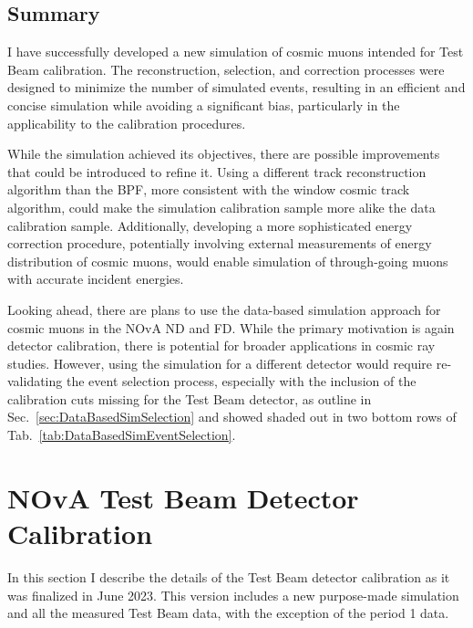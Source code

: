 \subsection{Summary}
I have successfully developed a new simulation of cosmic muons intended for Test Beam calibration. The reconstruction, selection, and correction processes were designed to minimize the number of simulated events, resulting in an efficient and concise simulation while avoiding a significant bias, particularly in the applicability to the calibration procedures.

While the simulation achieved its objectives, there are possible improvements that could be introduced to refine it. Using a different track reconstruction algorithm than the \gls{BPF}, more consistent with the window cosmic track algorithm, could make the simulation calibration sample more alike the data calibration sample. Additionally, developing a more sophisticated energy correction procedure, potentially involving external measurements of energy distribution of cosmic muons, would enable simulation of through-going muons with accurate incident energies.

Looking ahead, there are plans to use the data-based simulation approach for cosmic muons in the \gls{NOvA} \gls{ND} and \gls{FD}. While the primary motivation is again detector calibration, there is potential for broader applications in cosmic ray studies. However, using the simulation for a different detector would require re-validating the event selection process, especially with the inclusion of the calibration cuts missing for the Test Beam detector, as outline in Sec.~\ref{sec:DataBasedSimSelection} and showed shaded out in two bottom rows of Tab.~\ref{tab:DataBasedSimEventSelection}.

\section{NOvA Test Beam Detector Calibration}\label{sec:TBCalibrationSection}
In this section I describe the details of the Test Beam detector calibration as it was finalized in June 2023. This version includes a new purpose-made simulation and all the measured Test Beam data, with the exception of the period 1 data.

